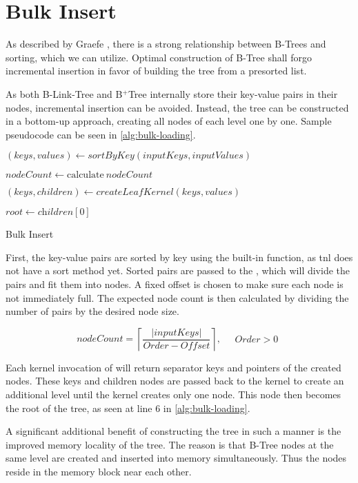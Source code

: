 \section{Bulk Insert}

As described by Graefe \cite{goetz-tech}, there is a strong relationship between B-Trees and sorting, which we can utilize. Optimal construction of B-Tree shall forgo incremental insertion in favor of building the tree from a presorted list.

As both B-Link-Tree and B$^+$Tree internally store their key-value pairs in their nodes, incremental insertion can be avoided. Instead, the tree can be constructed in a bottom-up approach, creating all nodes of each level one by one. Sample pseudocode can be seen in \cref{alg:bulk-loading}.

\begin{algorithm}[H]
  \DontPrintSemicolon

  $(\mathit{keys}, \mathit{values}) \gets \mathit{sortByKey}(\mathit{inputKeys}, \mathit{inputValues})$\;

  $\mathit{nodeCount} \gets \text{calculate}\ \mathit{nodeCount}$\;

  $(\mathit{keys}, \mathit{children}) \gets \mathit{createLeafKernel}(\mathit{keys}, \mathit{values})$\;

  $\textit{root} \gets \textit{children}[0]$\;
  \caption{Bulk Insert}
  \label{alg:bulk-loading}
\end{algorithm}

First, the key-value pairs are sorted by key using the built-in  function, as \acrshort{tnl} does not have a sort method yet. Sorted pairs are passed to the , which will divide the pairs and fit them into nodes. A fixed offset is chosen to make sure each node is not immediately full.
The expected node count is then calculated by dividing the number of pairs by the desired node size.

$$\mathit{nodeCount} = \left\lceil\frac{|\mathit{inputKeys}|}{\mathit{Order} - \mathit{Offset}}\right\rceil,\quad \begin{aligned} \mathit{Order} > 0\end{aligned}$$

Each kernel invocation of  will return separator keys and pointers of the created nodes. These keys and children nodes are passed back to the kernel to create an additional level until the kernel creates only one node. This node then becomes the root of the tree, as seen at line 6 in \cref{alg:bulk-loading}.

A significant additional benefit of constructing the tree in such a manner is the improved memory locality of the tree. The reason is that B-Tree nodes at the same level are created and inserted into memory simultaneously. Thus the nodes reside in the memory block near each other.


